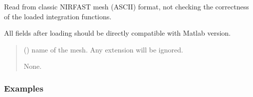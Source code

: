 \documentclass[letterpaper,10pt,english]{sphinxmanual}
\begin{document}
\begin{fulllineitems}

\begin{fulllineitems}
\label{\detokenize{_autosummary/nirfasterff.base.fluor_mesh.fluormesh:nirfasterff.base.fluor_mesh.fluormesh.from_file}}
\pysigstartsignatures
\pysiglinewithargsret
{}
{}
{}
\pysigstopsignatures
\sphinxAtStartPar
Read from classic NIRFAST mesh (ASCII) format, not checking the correctness of the loaded integration functions.

\sphinxAtStartPar
All fields after loading should be directly compatible with Matlab version.
\begin{quote}\begin{description}
\sphinxAtStartPar
{} () \textendash{} name of the mesh. Any extension will be ignored.

\sphinxAtStartPar
None.

\end{description}\end{quote}
\subsubsection*{Examples}

\begin{sphinxVerbatim}[commandchars=\\\{\}]
  
\end{sphinxVerbatim}

\end{fulllineitems}



\end{fulllineitems}
\end{document}
